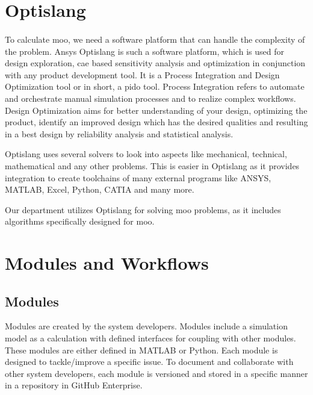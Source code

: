 
\section{Optislang}
\paragraph{}

To calculate \acrshort{moo}, we need a software platform that can handle the complexity of the problem. Ansys Optislang \cite{optislang} is such a software 
platform, which is used for design exploration, \acrshort{cae} based sensitivity analysis and optimization in conjunction with any product development tool. 
It is a Process Integration and Design Optimization tool or in short, a \acrshort{pido} tool. Process Integration refers to automate and orchestrate manual 
simulation processes and to realize complex workflows. Design Optimization aims for better understanding of your design, optimizing the product, identify an 
improved design which has the desired qualities and resulting in a best design by reliability analysis and statistical analysis.  


Optislang uses several solvers to look into aspects like mechanical, technical, mathematical and any other problems. This is easier in Optislang as it provides
integration to create toolchains of many external programs like ANSYS, MATLAB, Excel, Python, CATIA and many more.


Our department utilizes Optislang for solving \acrshort{moo} problems, as it includes algorithms specifically designed for \acrshort{moo}.
\section{Modules and Workflows}
\subsection{Modules}
Modules are created by the system developers. Modules include a simulation model as a calculation with defined interfaces for coupling with other modules. 
These modules are either defined in MATLAB or Python. Each module is designed to tackle/improve a specific issue. To document and collaborate with other
system developers, each module is versioned and stored in a specific manner in a repository in GitHub Enterprise.

